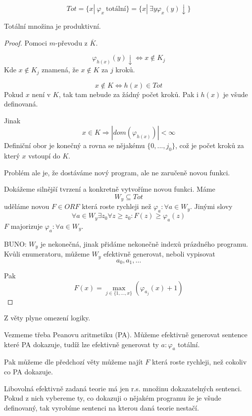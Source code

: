 \begin{definition}\label{tot_mn}
	\[ Tot = \{ x |\ \varphi_x\ \text{totální} \} = \{ x |\ \exists y \varphi_x(y) \downarrow \} \]
\end{definition}
\begin{lemma}
	Totální množina je produktivní.
\end{lemma}
\begin{proof}
	Pomoci $m$-převodu z $\overline{K}$.

	\[ \varphi_{h(x)} (y) \downarrow \iff x \notin K_j \]
	Kde $x \notin K_j$ znamená, že $x \notin K$ za $j$ kroků.

	\[ x \notin K \iff h(x) \in Tot \]
	Pokud $x$ není v $K$, tak tam nebude za žádný počet kroků. Pak i $h(x)$ je všude definovaná.

	Jinak
	\[ x \in K \Rightarrow |dom(\varphi_{h(x)})| < \infty \]
	Definiční obor je konečný a rovna se nějakému $\{ 0, ..., j_0 \}$, což je počet kroků za který $x$ vstoupí do $K$.

	Problém ale je, že dostáváme nový program, ale ne zaručeně novou funkci.

	Dokážeme silnější tvrzení a konkretně vytvoříme novou funkci.
	Máme
	\[ W_y \subseteq Tot \]
	uděláme novou $F \in ORF$ která roste rychleji než $\varphi_a: \forall a \in W_y$.
	Jinými slovy
	\[ \forall a \in W_y \exists z_0 \forall z \geq z_0: F(z) \geq \varphi_a(z) \]
	$F$ majorizuje $\varphi_a: \forall a \in W_y$.

	BUNO: $W_y$ je nekonečná, jinak přidáme nekonečně indexů prázdného programu.
	Kvůli enumeratoru, můžeme $W_y$ efektivně generovat, neboli vypisovat
	\[ a_0, a_1, \ldots \]

	Pak
	\[ F(x) = \max_{j \in \{ 1, \ldots, x \} } (\varphi_{a_j}(x) + 1) \]
\end{proof}

\begin{consequence}
	Z věty plyne omezení logiky.

	Vezmeme třeba Peanovu aritmetiku (PA).
	Můžeme efektivně generovat sentence které PA dokazuje, tudíž lze efektivně generovat ty $a: \varphi_a$ totální.

	Pak můžeme dle předchozí věty můžeme najít $F$ která roste rychleji, než cokoliv co PA dokazuje.

	Libovolná efektivně zadaná teorie má jen r.s. množinu dokazatelných sentenci.
	Pokud z nich vybereme ty, co dokazuji o nějakém programu že je všude definovaný, tak vyrobíme sentenci na kterou daná teorie nestačí.
\end{consequence}
